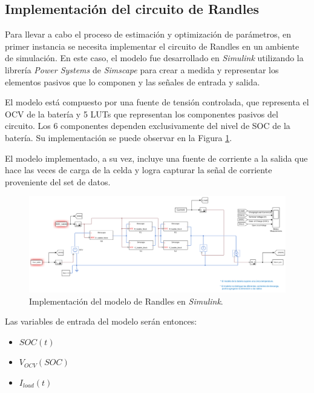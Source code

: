 \documentclass[10pt, a4paper]{report}
\begin{document}
\subsection{Implementación del circuito de Randles}

Para llevar a cabo el proceso de estimación y optimizaci\'on de par\'ametros, en
primer instancia se necesita implementar el circuito de Randles en un ambiente
de simulaci\'on. En este caso, el modelo fue desarrollado en \emph{Simulink}
utilizando la librer\'ia \emph{Power Systems} de \emph{Simscape} para crear a
medida y representar los elementos pasivos que lo componen y las señales de
entrada y salida.

El modelo est\'a compuesto por una fuente de tensi\'on controlada, que
representa el \acrshort{OCV} de la bater\'ia y 5 \acrshort{LUT}s que representan
los componentes pasivos del circuito. Los 6 componentes dependen exclusivamente
del nivel de \acrshort{SOC} de la bater\'ia. Su implementaci\'on se puede
observar en la Figura \ref{battery_model_simulink}. 

El modelo implementado, a su vez, incluye una fuente de corriente a la salida
que hace las veces de carga de la celda y logra capturar la señal de corriente
proveniente del set de datos.

\begin{figure}[h!]
    \begin{center}
        \includegraphics[width=.9\textwidth]{battery_model_simulink.png}
        \caption{Implementaci\'on del modelo de Randles en \emph{Simulink}.}
        \label{battery_model_simulink}
    \end{center}
\end{figure}
\FloatBarrier

Las variables de entrada del modelo serán entonces: 

\begin{itemize}
    \item $SOC(t)$
    \item $V_{OCV}(SOC)$
    \item $I_{load}(t)$
\end{itemize}
\end{document}
